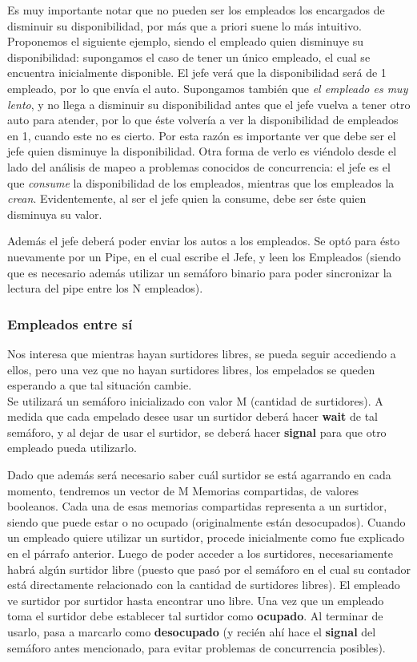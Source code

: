 \documentclass[a4paper,12pt]{article}
\begin{document}
Es muy importante notar que no pueden ser los empleados los encargados de disminuir su disponibilidad, por más que a priori suene lo más intuitivo. Proponemos el siguiente ejemplo, siendo el empleado quien disminuye su disponibilidad: supongamos el caso de tener un único empleado, el cual se encuentra inicialmente disponible. El jefe verá que la disponibilidad será de 1 empleado, por lo que envía el auto. Supongamos también que \textit{el empleado es muy lento}, y no llega a disminuir su disponibilidad antes que el jefe vuelva a tener otro auto para atender, por lo que éste volvería a ver la disponibilidad de empleados en 1, cuando este no es cierto. Por esta razón es importante ver que debe ser el jefe quien disminuye la disponibilidad. Otra forma de verlo es viéndolo desde el lado del análisis de mapeo a problemas conocidos de concurrencia: el jefe es el que \textit{consume} la disponibilidad de los empleados, mientras que los empleados la \textit{crean}. Evidentemente, al ser el jefe quien la consume, debe ser éste quien disminuya su valor.

Además el jefe deberá poder enviar los autos a los empleados. Se optó para ésto nuevamente por un Pipe, en el cual escribe el Jefe, y leen los Empleados (siendo que es necesario además utilizar un semáforo binario para poder sincronizar la lectura del pipe entre los N empleados).

\subsubsection{Empleados entre sí}
Nos interesa que mientras hayan surtidores libres, se pueda seguir accediendo a ellos, pero una vez que no hayan surtidores libres, los empelados se queden esperando a que tal situación cambie.\\
Se utilizará un semáforo inicializado con valor M (cantidad de surtidores). A medida que cada empelado desee usar un surtidor deberá hacer \textbf{wait} de tal semáforo, y al dejar de usar el surtidor, se deberá hacer \textbf{signal} para que otro empleado pueda utilizarlo.

Dado que además será necesario saber cuál surtidor se está agarrando en cada momento, tendremos un vector de M Memorias compartidas, de valores booleanos. Cada una de esas memorias compartidas representa a un surtidor, siendo que puede estar o no ocupado (originalmente están desocupados). Cuando un empleado quiere utilizar un surtidor, procede inicialmente como fue explicado en el párrafo anterior. Luego de poder acceder a los surtidores, necesariamente habrá algún surtidor libre (puesto que pasó por el semáforo en el cual su contador está directamente relacionado con la cantidad de surtidores libres). El empleado ve surtidor por surtidor hasta encontrar uno libre. Una vez que un empleado toma el surtidor debe establecer tal surtidor como \textbf{ocupado}. Al terminar de usarlo, pasa a marcarlo como \textbf{desocupado} (y recién ahí hace el \textbf{signal} del semáforo antes mencionado, para evitar problemas de concurrencia posibles).
\end{document}
